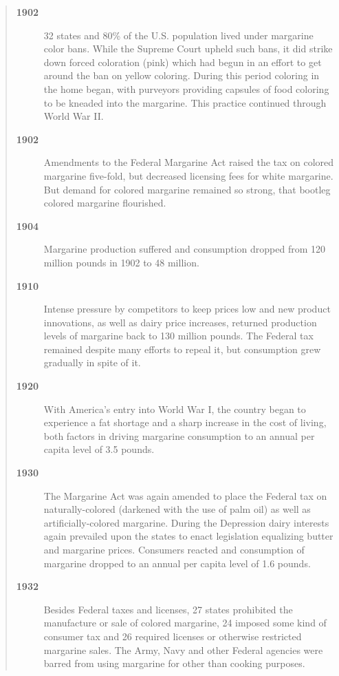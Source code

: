 \documentclass[mnsc,blindrev]{informs3} %
\begin{document}
\begin{quotation}

\begin{description}

\item[\bf 1902] 32 states and 80\% of the U.S. population lived under
margarine color bans. While the Supreme Court upheld such bans, it
did strike down forced coloration (pink) which had begun in an
effort to get around the ban on yellow coloring. During this period
coloring in the home began, with purveyors providing capsules of
food coloring to be kneaded into the margarine. This practice
continued through World War II.

\item[\bf 1902] Amendments to the Federal Margarine Act raised the tax
on colored margarine five-fold, but decreased licensing fees for
white margarine. But demand for colored margarine remained so
strong, that bootleg colored margarine flourished.

\item[\bf 1904] Margarine production suffered and consumption dropped
from 120 million pounds in 1902 to 48 million.

\item[\bf 1910] Intense pressure by competitors to keep prices low and
new product innovations, as well as dairy price increases, returned
production levels of margarine back to 130 million pounds. The
Federal tax remained despite many efforts to repeal it, but
consumption grew gradually in spite of it.

\item[\bf 1920] With America's entry into World War I, the country began
to experience a fat shortage and a sharp increase in the cost of
living,  both factors in driving margarine consumption to an annual
per capita level of 3.5 pounds.

\item[\bf 1930] The Margarine Act was again amended to place the Federal
tax on naturally-colored (darkened with the use of palm oil) as well
as artificially-colored margarine. During the Depression dairy
interests again prevailed upon the states to enact legislation
equalizing butter and margarine prices. Consumers reacted and
consumption of margarine dropped to an annual per capita level of
1.6 pounds.

\item[\bf 1932] Besides Federal taxes and licenses, 27 states prohibited
the manufacture or sale of colored margarine, 24 imposed some kind
of  consumer tax and 26 required licenses or otherwise restricted
margarine sales. The Army, Navy and other Federal agencies were
barred from using margarine for other than cooking purposes.


\end{description}
\end{quotation}
\end{document}
